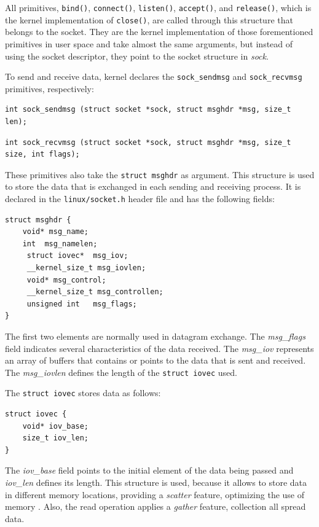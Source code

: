 All primitives, \texttt{bind()}, \texttt{connect()}, \texttt{listen()}, \texttt{accept()}, and \texttt{release()}, which is the kernel implementation of \texttt{close()}, are called through this structure that belongs to the socket. They are the kernel implementation of those forementioned primitives in user space and take almost the same arguments, but instead of using the socket descriptor, they point to the socket structure in \textit{sock}.

To send and receive data, kernel declares the \texttt{sock\_sendmsg} and \texttt{sock\_recvmsg} primitives, respectively:

\begin{lstlisting}[style=CInputStyle]
int sock_sendmsg (struct socket *sock, struct msghdr *msg, size_t len);
\end{lstlisting}

\begin{lstlisting}[style=CInputStyle]
int sock_recvmsg (struct socket *sock, struct msghdr *msg, size_t size, int flags);
\end{lstlisting}

These primitives also take the \texttt{struct msghdr} as argument. This structure is used to store the data that is exchanged in each sending and receiving process. It is declared in the \texttt{linux/socket.h} header file and has the following fields:

\begin{lstlisting}[style=CInputStyle]
struct msghdr {
    void* msg_name;
    int	 msg_namelen;
     struct iovec*	msg_iov;
     __kernel_size_t msg_iovlen;
     void* msg_control;
     __kernel_size_t msg_controllen;
     unsigned int	msg_flags;
}
\end{lstlisting}

The first two elements are normally used in datagram exchange. The \textit{msg\_flags} field indicates several characteristics of the data received. The \textit{msg\_iov} represents an array of buffers that contains or points to the data that is sent and received. The \textit{msg\_iovlen} defines the length of the \texttt{struct iovec} used.

The \texttt{struct iovec} stores data as follows:

\begin{lstlisting}[style=CInputStyle]
struct iovec {
    void* iov_base;
    size_t iov_len;
}
\end{lstlisting}

The \textit{iov\_base} field points to the initial element of the data being passed and \textit{iov\_len} defines its length. This structure is used, because it allows to store data in different memory locations, providing a \textit{scatter} feature, optimizing the use of memory \cite{Stevens:APUE}. Also, the read operation applies a \textit{gather} feature, collection all spread data.





